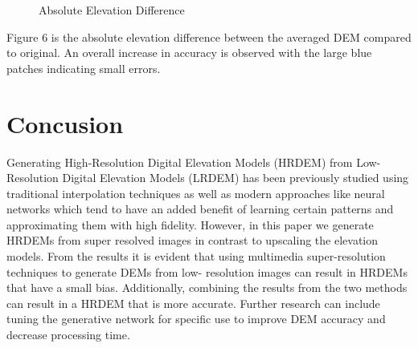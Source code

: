 \documentclass[conference]{IEEEtran}
\begin{document}
\begin{figure}[htbp]
    \caption{Absolute Elevation Difference}
    \label{avg}
\end{figure}


Figure 6 is the absolute elevation difference between the averaged DEM
compared to original. An overall increase in accuracy is
observed with the large blue patches indicating small errors.

\section{Concusion}
Generating High-Resolution Digital Elevation Models
(HRDEM) from Low-Resolution Digital Elevation Models
(LRDEM) has been previously studied using traditional
interpolation techniques as well as modern approaches like
neural networks which tend to have an added benefit of
learning certain patterns and approximating them with high
fidelity. However, in this paper we generate HRDEMs from
super resolved images in contrast to upscaling the elevation
models. From the results it is evident that using multimedia
super-resolution techniques to generate DEMs from low-
resolution images can result in HRDEMs that have a small
bias. Additionally, combining the results from the two
methods can result in a HRDEM that is more accurate.
Further research can include tuning the generative network
for specific use to improve DEM accuracy and decrease
processing time.
\end{document}
